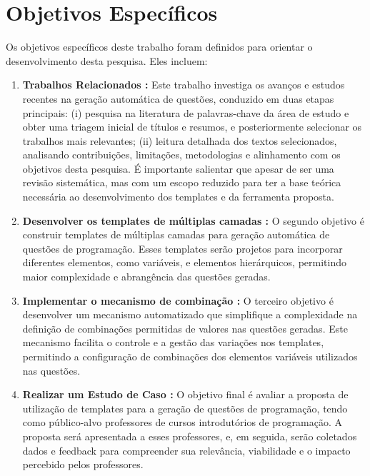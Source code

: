 \section{Objetivos Específicos}

Os objetivos específicos deste trabalho foram definidos para orientar o desenvolvimento desta pesquisa. Eles incluem:

\begin{enumerate}[label=\textbf{\alph*)}]
    \item \textbf{Trabalhos Relacionados :} Este trabalho investiga os avanços e estudos recentes na geração automática de questões, conduzido em duas etapas principais: (i) pesquisa na literatura de palavras-chave da área de estudo e obter uma triagem inicial de títulos e resumos, e posteriormente selecionar os trabalhos mais relevantes; (ii) leitura detalhada dos textos selecionados, analisando contribuições, limitações, metodologias e alinhamento com os objetivos desta pesquisa. É importante salientar que apesar de ser uma revisão sistemática, mas com um escopo reduzido para ter a base teórica necessária ao desenvolvimento dos templates e da ferramenta proposta. 
    \item \textbf{Desenvolver os templates de múltiplas camadas :}  O segundo objetivo é construir templates de múltiplas camadas para geração automática de questões de programação. Esses templates serão projetos para incorporar diferentes elementos, como variáveis, e elementos hierárquicos, permitindo maior complexidade e abrangência das questões geradas. 
    \item \textbf{Implementar o mecanismo de combinação :} O terceiro objetivo é desenvolver um mecanismo automatizado que simplifique a complexidade na definição de combinações permitidas de valores nas questões geradas. Este mecanismo facilita o controle e a gestão das variações nos templates, permitindo a configuração de combinações dos elementos variáveis utilizados nas questões.
    \item \textbf{Realizar um Estudo de Caso :}  
O objetivo final é avaliar a proposta de utilização de templates para a geração de questões de programação, tendo como público-alvo professores de cursos introdutórios de programação. A proposta será apresentada a esses professores, e, em seguida, serão coletados dados e feedback para compreender sua relevância, viabilidade e o impacto percebido pelos professores.

 
\end{enumerate}


